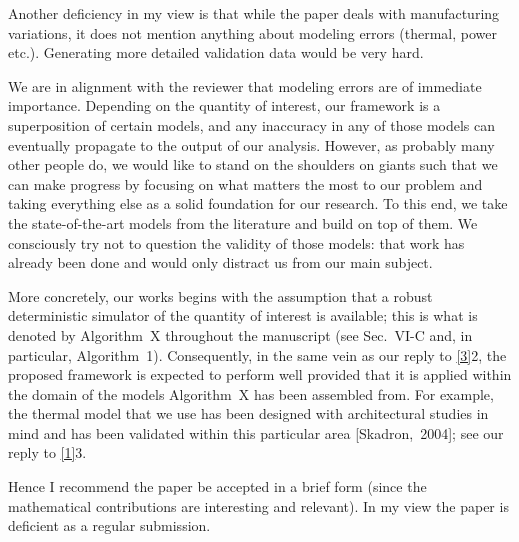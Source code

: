 \begin{reviewer}
Another deficiency in my view is that while the paper deals with manufacturing
variations, it does not mention anything about modeling errors (thermal, power
etc.). Generating more detailed validation data would be very hard.
\end{reviewer}

\begin{authors}
We are in alignment with the reviewer that modeling errors are of immediate
importance. Depending on the quantity of interest, our framework is a
superposition of certain models, and any inaccuracy in any of those models can
eventually propagate to the output of our analysis. However, as probably many
other people do, we would like to stand on the shoulders on giants such that we
can make progress by focusing on what matters the most to our problem and
taking everything else as a solid foundation for our research. To this end, we
take the state-of-the-art models from the literature and build on top of them.
We consciously try not to question the validity of those models: that work has
already been done and would only distract us from our main subject.

More concretely, our works begins with the assumption that a robust
deterministic simulator of the quantity of interest is available; this is what
is denoted by Algorithm~X throughout the manuscript (see Sec.~VI-C and, in
particular, Algorithm~1). Consequently, in the same vein as our reply to
\cref{3}{2}, the proposed framework is expected to perform well provided that it
is applied within the domain of the models Algorithm~X has been assembled from.
For example, the thermal model that we use has been designed with architectural
studies in mind and has been validated within this particular area
[Skadron,~2004]; see our reply to \cref{1}{3}.

\begin{actions}
\end{actions}
\end{authors}

\begin{reviewer}
Hence I recommend the paper be accepted in a brief form (since the mathematical
contributions are interesting and relevant). In my view the paper is deficient
as a regular submission.
\end{reviewer}

